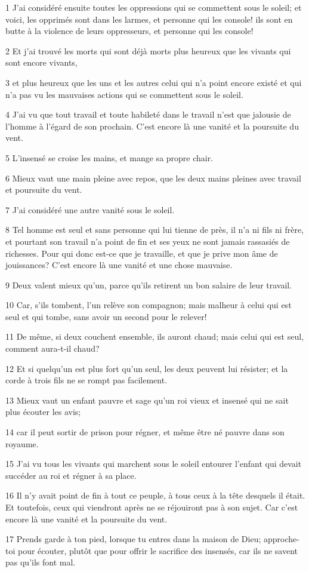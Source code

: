 \par 1 J'ai considéré ensuite toutes les oppressions qui se commettent sous le soleil; et voici, les opprimés sont dans les larmes, et personne qui les console! ils sont en butte à la violence de leurs oppresseurs, et personne qui les console!
\par 2 Et j'ai trouvé les morts qui sont déjà morts plus heureux que les vivants qui sont encore vivants,
\par 3 et plus heureux que les uns et les autres celui qui n'a point encore existé et qui n'a pas vu les mauvaises actions qui se commettent sous le soleil.
\par 4 J'ai vu que tout travail et toute habileté dans le travail n'est que jalousie de l'homme à l'égard de son prochain. C'est encore là une vanité et la poursuite du vent.
\par 5 L'insensé se croise les mains, et mange sa propre chair.
\par 6 Mieux vaut une main pleine avec repos, que les deux mains pleines avec travail et poursuite du vent.
\par 7 J'ai considéré une autre vanité sous le soleil.
\par 8 Tel homme est seul et sans personne qui lui tienne de près, il n'a ni fils ni frère, et pourtant son travail n'a point de fin et ses yeux ne sont jamais rassasiés de richesses. Pour qui donc est-ce que je travaille, et que je prive mon âme de jouissances? C'est encore là une vanité et une chose mauvaise.
\par 9 Deux valent mieux qu'un, parce qu'ils retirent un bon salaire de leur travail.
\par 10 Car, s'ils tombent, l'un relève son compagnon; mais malheur à celui qui est seul et qui tombe, sans avoir un second pour le relever!
\par 11 De même, si deux couchent ensemble, ils auront chaud; mais celui qui est seul, comment aura-t-il chaud?
\par 12 Et si quelqu'un est plus fort qu'un seul, les deux peuvent lui résister; et la corde à trois fils ne se rompt pas facilement.
\par 13 Mieux vaut un enfant pauvre et sage qu'un roi vieux et insensé qui ne sait plus écouter les avis;
\par 14 car il peut sortir de prison pour régner, et même être né pauvre dans son royaume.
\par 15 J'ai vu tous les vivants qui marchent sous le soleil entourer l'enfant qui devait succéder au roi et régner à sa place.
\par 16 Il n'y avait point de fin à tout ce peuple, à tous ceux à la tête desquels il était. Et toutefois, ceux qui viendront après ne se réjouiront pas à son sujet. Car c'est encore là une vanité et la poursuite du vent.
\par 17 Prends garde à ton pied, lorsque tu entres dans la maison de Dieu; approche-toi pour écouter, plutôt que pour offrir le sacrifice des insensés, car ils ne savent pas qu'ils font mal.

